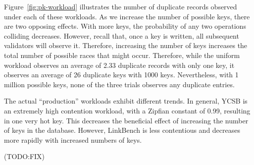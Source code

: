 Figure~\ref{fig:pk-workload} illustrates the number of duplicate
records observed under each of these workloads. As we increase the
number of possible keys, there are two opposing effects. With
more keys, the probability of any two operations colliding
decreases. However, recall that, once a key is written, all subsequent
validators will observe it. Therefore, increasing the number of keys
increases the total number of possible races that might
occur. Therefore, while the uniform workload observes an average of
2.33 duplicate records with only one key, it observes an average of 26
duplicate keys with 1000 keys. Nevertheless, with 1 million possible
keys, none of the three trials observes any duplicate entries.

The actual ``production'' workloads exhibit different trends. In
general, YCSB is an extremely high contention workload, with a Zipfian
constant of 0.99, resulting in one very hot key. This decreases the
beneficial effect of increasing the number of keys in the
database. However, LinkBench is less contentious and decreases more
rapidly with increased numbers of keys.

(TODO:FIX)

